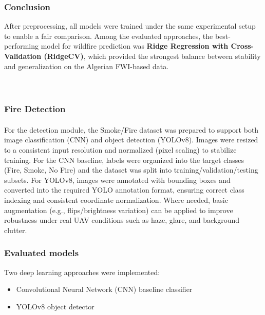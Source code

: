 \documentclass[11pt,a4paper]{report}
\begin{document}
\subsubsection{Conclusion}

After preprocessing, all models were trained under the same experimental setup to enable a fair comparison. Among the evaluated approaches, the best-performing model for wildfire prediction was \textbf{Ridge Regression with Cross-Validation (RidgeCV)}, which provided the strongest balance between stability and generalization on the Algerian FWI-based data. \\ \\ \\

\subsubsection{Fire Detection}
\label{subsec:fire-detection}

\paragraph{}
For the detection module, the Smoke/Fire dataset was prepared to support both image classification (CNN) and object detection (YOLOv8). Images were resized to a consistent input resolution and normalized (pixel scaling) to stabilize training. For the CNN baseline, labels were organized into the target classes (Fire, Smoke, No Fire) and the dataset was split into training/validation/testing subsets. For YOLOv8, images were annotated with bounding boxes and converted into the required YOLO annotation format, ensuring correct class indexing and consistent coordinate normalization. Where needed, basic augmentation (e.g., flips/brightness variation) can be applied to improve robustness under real UAV conditions such as haze, glare, and background clutter.

\subsubsection{Evaluated models}
Two deep learning approaches were implemented:

\begin{itemize}
    \item Convolutional Neural Network (CNN) baseline classifier
    \item YOLOv8 object detector
    \\ \\ 
\end{itemize}
\end{document}
